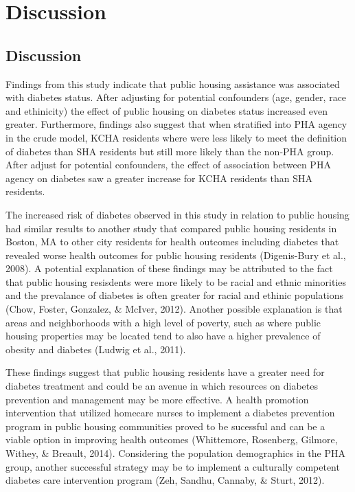 \documentclass [11pt, proquest] {uwthesis}[2015/03/03]
\begin{document}
\chapter{Discussion}\label{discussion}

\section{Discussion}\label{discussion-1}

Findings from this study indicate that public housing assistance was
associated with diabetes status. After adjusting for potential
confounders (age, gender, race and ethinicity) the effect of public
housing on diabetes status increased even greater. Furthermore, findings
also suggest that when stratified into PHA agency in the crude model,
KCHA residents where were less likely to meet the definition of diabetes
than SHA residents but still more likely than the non-PHA group. After
adjust for potential confounders, the effect of association between PHA
agency on diabetes saw a greater increase for KCHA residents than SHA
residents.

The increased risk of diabetes observed in this study in relation to
public housing had similar results to another study that compared public
housing residents in Boston, MA to other city residents for health
outcomes including diabetes that revealed worse health outcomes for
public housing residents (Digenis-Bury et al., 2008). A potential
explanation of these findings may be attributed to the fact that public
housing resisdents were more likely to be racial and ethnic minorities
and the prevalance of diabetes is often greater for racial and ethinic
populations (Chow, Foster, Gonzalez, \& McIver, 2012). Another possible
explanation is that areas and neighborhoods with a high level of
poverty, such as where public housing properties may be located tend to
also have a higher prevalence of obesity and diabetes (Ludwig et al.,
2011).

These findings suggest that public housing residents have a greater need
for diabetes treatment and could be an avenue in which resources on
diabetes prevention and management may be more effective. A health
promotion intervention that utilized homecare nurses to implement a
diabetes prevention program in public housing communities proved to be
sucessful and can be a viable option in improving health outcomes
(Whittemore, Rosenberg, Gilmore, Withey, \& Breault, 2014). Considering
the population demographics in the PHA group, another successful
strategy may be to implement a culturally competent diabetes care
intervention program (Zeh, Sandhu, Cannaby, \& Sturt, 2012).
\end{document}
